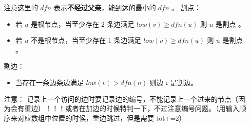 注意这里的 $dfn$ 表示\textbf{不经过父亲}，能到达的最小的 $dfn$ 。
割点：
\begin{itemize}
    \item 若 $u$ 是根节点，当至少存在 $2$ 条边满足 $low(v)\ge dfn(u)$ 则 $u$ 是割点 。
    \item 若 $u$ 不是根节点，当至少存在 $1$ 条边满足 $low(v)\ge dfn(u)$ 则 $u$ 是割点 。
\end{itemize}
割边：
\begin{itemize}
    \item 当存在一条边条边满足 $low(v)>dfn(u)$ 则边 $i$ 是割边。
\end{itemize}
注意：
记录上一个访问的边时要记录边的编号，不能记录上一个过来的节点（因为会有重边）！！！或者在加边的时候特判一下，不过注意编号问题。（用输入顺序来对应数组中位置的时候，重边跳过，但是需要 tot+=2）